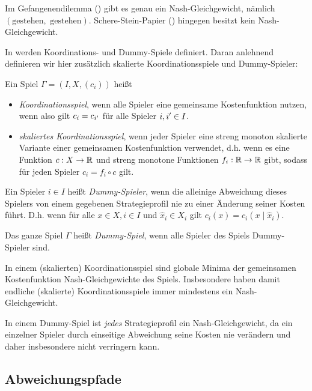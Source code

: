 \begin{bsp}
	Im Gefangenendilemma () gibt es genau ein Nash-Gleichgewicht, nämlich $(\text{gestehen},\text{ gestehen})$. Schere-Stein-Papier () hingegen besitzt kein Nash-Gleichgewicht.
\end{bsp}

In \cite[Definition 2.2]{KoordDummy} werden Koordinations- und Dummy-Spiele definiert. Daran anlehnend definieren wir hier zusätzlich skalierte Koordinationsspiele und Dummy-Spieler:
\begin{defn}
	Ein Spiel $\Gamma = (I, X, (c_i))$ heißt
	\begin{itemize}
		\item \emph{Koordinationsspiel}, wenn alle Spieler eine gemeinsame Kostenfunktion nutzen, wenn also gilt $c_i = c_{i'}$ für alle Spieler $i,{i'} \in I$.
		\item \emph{skaliertes Koordinationsspiel}, wenn jeder Spieler eine streng monoton skalierte Variante einer gemeinsamen Kostenfunktion verwendet, d.h. wenn es eine Funktion $c: X \to \mathbb{R}$ und streng monotone Funktionen $f_i: \mathbb{R} \to \mathbb{R}$ gibt, sodass für jeden Spieler $c_i = f_i \circ c$ gilt.
	\end{itemize}
	Ein Spieler $i \in I$ heißt \emph{Dummy-Spieler}, wenn die alleinige Abweichung dieses Spielers von einem gegebenen Strategieprofil nie zu einer Änderung seiner Kosten führt. D.h. wenn für alle $x \in X, i \in I$ und $\hat{x}_i \in X_i$ gilt $c_i(x) = c_i(x \mid \hat{x}_i)$. 
	
	Das ganze Spiel $\Gamma$ heißt \emph{Dummy-Spiel}, wenn alle Spieler des Spiels Dummy-Spieler sind.
\end{defn}

\begin{beob}
	In einem (skalierten) Koordinationsspiel sind globale Minima der gemeinsamen Kostenfunktion Nash-Gleichgewichte des Spiels. Insbesondere haben damit endliche (skalierte) Koordinationsspiele immer mindestens ein Nash-Gleichgewicht.
	
	In einem Dummy-Spiel ist \emph{jedes} Strategieprofil ein Nash-Gleichgewicht, da ein einzelner Spieler durch einseitige Abweichung seine Kosten nie verändern und daher insbesondere nicht verringern kann.
\end{beob}


\subsection{Abweichungspfade}

